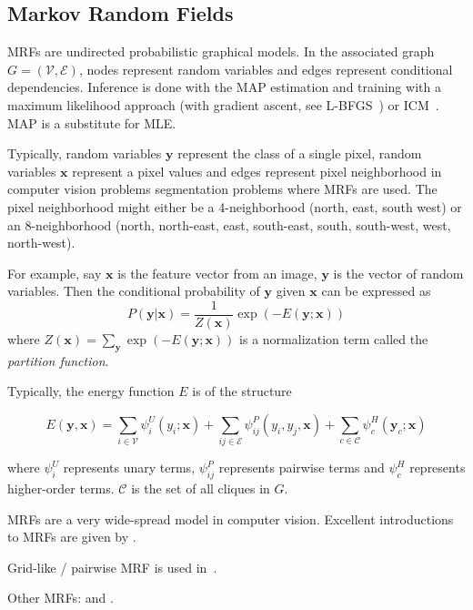 
\subsection{Markov Random Fields}\label{subsec:markov-random-fields}
\Glspl{MRF} are undirected probabilistic graphical models. In the associated
graph $G=(\mathcal{V}, \mathcal{E})$, nodes represent random variables and
edges represent conditional dependencies. Inference is done with the \gls{MAP}
estimation and training with a maximum likelihood approach (with gradient
ascent, see L-BFGS~\cite{liu1989limited}) or \gls{ICM}~\cite{10.2307/2345426}.
\Gls{MAP} is a substitute for \gls{MLE}.

Typically, random variables $\mathbf{y}$ represent the class of a single pixel,
random variables $\mathbf{x}$ represent a pixel values
and edges represent pixel neighborhood in computer vision problems segmentation problems
where \glspl{MRF} are used. The pixel neighborhood might either be a
4-neighborhood (north, east, south west) or an 8-neighborhood (north,
north-east, east, south-east, south, south-west, west, north-west).

For example, say $\mathbf{x}$ is the feature vector from an image, $\mathbf{y}$
is the vector of random variables. Then the conditional probability of $\mathbf{y}$
given $\mathbf{x}$ can be expressed as
\[P(\mathbf{y}|\mathbf{x}) = \frac{1}{Z(\mathbf{x})} \exp(-E(\mathbf{y};\mathbf{x}))\]
where $Z(\mathbf{x}) = \sum_{\mathbf{y}} \exp(-E(\mathbf{y};\mathbf{x}))$ is
a normalization term called the \textit{partition function}.

Typically, the energy function $E$ is of the structure

\[E(\mathbf{y}, \mathbf{x}) = \sum_{i \in \mathcal{V}} \psi_i^U (y_i; \mathbf{x}) + \sum_{ij \in \mathcal{E}} \psi_{ij}^P(y_i, y_j, \mathbf{x}) + \sum_{c \in \mathcal{C}} \psi_c^H(\mathbf{y}_c; \mathbf{x})\]

where $\psi_i^U$ represents unary terms, $\psi_{ij}^P$ represents pairwise
terms and $\psi_c^H$ represents higher-order terms. $\mathcal{C}$ is the set
of all cliques in $G$.


\Glspl{MRF} are a very wide-spread model in computer vision. Excellent
introductions to \glspl{MRF} are given by
\cite{blake2011markov,murphy2012machine}.


Grid-like / pairwise \gls{MRF} is used in~\cite{rother2004grabcut}.

Other \glspl{MRF}: \cite{zhang2001segmentation} and \cite{moser2012markov}.

